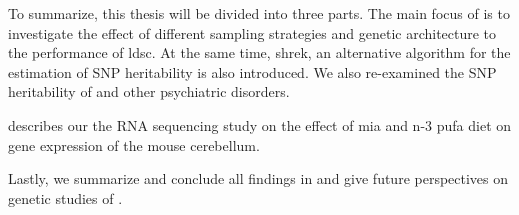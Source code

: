 	To summarize, this thesis will be divided into three parts. 
	The main focus of  is to investigate the effect of different sampling strategies and genetic architecture to the performance of \gls{ldsc}.
	At the same time, \gls{shrek}, an alternative algorithm for the estimation of \gls{SNP} heritability is also introduced. 
	We also re-examined the \gls{SNP} heritability of  and other psychiatric disorders.
	
	 describes our the RNA sequencing study on the effect of \gls{mia} and n-3 \gls{pufa} diet on gene expression of the mouse cerebellum. 

	
	Lastly, we summarize and conclude all findings in  and give future perspectives on genetic studies of .
	